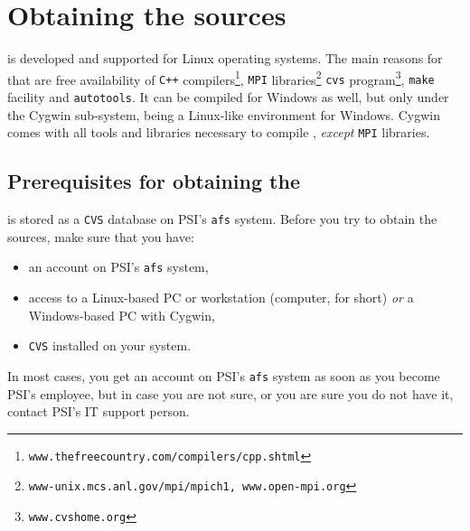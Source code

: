 \section{Obtaining the sources}
\label{sec_obtaining}

{\psiboil} is developed and supported for Linux operating systems.
The main reasons for that are free availability of {\tt C++} 
compilers\footnote{\tt www.thefreecountry.com/compilers/cpp.shtml},
{\tt MPI} libraries\footnote{\tt www-unix.mcs.anl.gov/mpi/mpich1, 
www.open-mpi.org}
{\tt cvs} program\footnote{\tt www.cvshome.org}, 
{\tt make} facility and {\tt autotools}.
It can be compiled for Windows as well, but only under the Cygwin sub-system,
being a Linux-like environment for Windows. Cygwin comes with all tools and
libraries necessary to compile {\psiboil}, {\em except} {\tt MPI} libraries.

\subsection{Prerequisites for obtaining the {\psiboil}}

{\psiboil} is stored as a {\tt CVS} database on PSI's {\tt afs} system. Before you
try to obtain the sources, make sure that you have:

\begin{itemize}
  \item an account on PSI's {\tt afs} system,
  \item access to a Linux-based PC or workstation (computer,
        for short) {\em or} a Windows-based PC with Cygwin,
  \item {\tt CVS} installed on your system.
\end{itemize}

In most cases, you get an account on PSI's {\tt afs} system as soon as you
become PSI's employee, but in case you are not sure, or you are sure 
you do not have it, contact PSI's IT support person.

